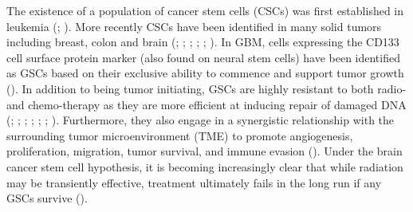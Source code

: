 \documentclass[
  letterpaper,
]{scrreprt}
\theoremstyle{definition}
\theoremstyle{remark}
\begin{document}
The existence of a population of cancer stem cells (CSCs) was first
established in leukemia (; ). More recently
CSCs have been identified in many solid tumors including breast, colon
and brain (;
;
;
;
;
). In GBM, cells expressing
the CD133 cell surface protein marker (also found on neural stem cells)
have been identified as GSCs based on their exclusive ability to
commence and support tumor growth (). In addition to being tumor initiating, GSCs are highly resistant
to both radio- and chemo-therapy as they are more efficient at inducing
repair of damaged DNA (;
; ; ;
;
;
). Furthermore, they also engage in
a synergistic relationship with the surrounding tumor microenvironment
(TME) to promote angiogenesis, proliferation, migration, tumor survival,
and immune evasion (). Under the
brain cancer stem cell hypothesis, it is becoming increasingly clear
that while radiation may be transiently effective, treatment ultimately
fails in the long run if any GSCs survive
().
\end{document}
